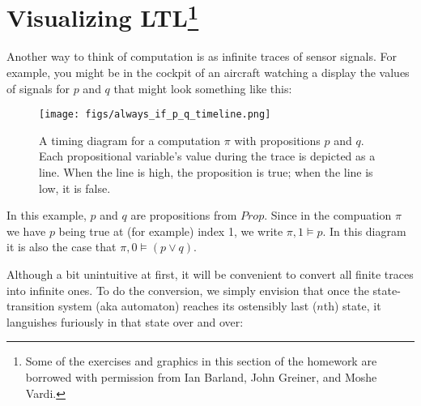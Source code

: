 \documentclass{elsarticle} %
\begin{document}
\section{Visualizing LTL\protect\footnote{Some of the exercises and graphics in this section of the homework are borrowed with permission from Ian Barland, John Greiner, and Moshe Vardi.}}

Another way to think of computation is as infinite traces of sensor signals. For example, you might be in the cockpit of an aircraft watching a display the values of signals for $p$ and $q$ that might look something like this:




\begin{figure}[H]
  \begin{center}
  \begin{minipage}[t]{\textwidth}
    \begin{center}
     \texttt{[image: figs/always\_if\_p\_q\_timeline.png]}
\caption{A timing diagram for a computation $\pi$ with propositions $p$ and $q$. Each propositional variable's value during the trace is depicted as a line. When the line is high, the proposition is true; when the line is low, it is false.}
     \label{always_if_p_q_timeline}
    \end{center}
  \end{minipage}
  \end{center}
\end{figure}



In this example, $p$ and $q$ are propositions from $Prop$. Since in the compuation $\pi$ we have $p$ being true at (for example) index 1, we write $\pi, 1 \vDash p$. In this diagram it is also the case that $\pi, 0 \vDash (p \vee q)$.

Although a bit unintuitive at first, it will be convenient to convert all finite traces into infinite ones. To do the conversion, we simply envision that once the state-transition system (aka automaton) reaches its ostensibly last ($n$th) state, it languishes furiously in that state over and over:
\end{document}
